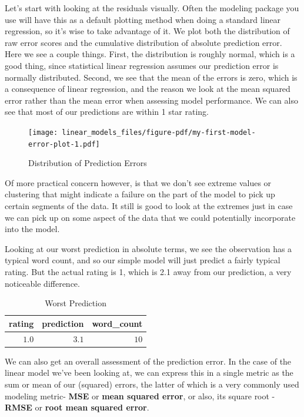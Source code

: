 \documentclass[
  letterpaper,
]{krantz}
\begin{document}
Let's start with looking at the residuals visually. Often the modeling
package you use will have this as a default plotting method when doing a
standard linear regression, so it's wise to take advantage of it. We
plot both the distribution of raw error scores and the cumulative
distribution of absolute prediction error. Here we see a couple things.
First, the distribution is roughly normal, which is a good thing, since
statistical linear regression assumes our prediction error is normally
distributed. Second, we see that the mean of the errors is zero, which
is a consequence of linear regression, and the reason we look at the
mean squared error rather than the mean error when assessing model
performance. We can also see that most of our predictions are within 1
star rating.

\begin{figure}

{\centering \texttt{[image: linear\_models\_files/figure-pdf/my-first-model-error-plot-1.pdf]}

}

\caption{Distribution of Prediction Errors}

\end{figure}

Of more practical concern however, is that we don't see extreme values
or clustering that might indicate a failure on the part of the model to
pick up certain segments of the data. It still is good to look at the
extremes just in case we can pick up on some aspect of the data that we
could potentially incorporate into the model.

Looking at our worst prediction in absolute terms, we see the
observation has a typical word count, and so our simple model will just
predict a fairly typical rating. But the actual rating is 1, which is
2.1 away from our prediction, a very noticeable difference.

\hypertarget{tbl-worst-prediction}{}
\begin{longtable}{rrr}
\caption{\label{tbl-worst-prediction}Worst Prediction }\tabularnewline

\toprule
rating & prediction & word\_count \\ 
\midrule\addlinespace[2.5pt]
\textcolor[HTML]{404040}{$1.0$} & \textcolor[HTML]{404040}{$3.1$} & \textcolor[HTML]{404040}{$10$} \\ 
\bottomrule
\end{longtable}

We can also get an overall assessment of the prediction error. In the
case of the linear model we've been looking at, we can express this in a
single metric as the sum or mean of our (squared) errors, the latter of
which is a very commonly used modeling metric- \textbf{MSE} or
\textbf{mean squared error}, or also, its square root - \textbf{RMSE} or
\textbf{root mean squared error}.
\end{document}
